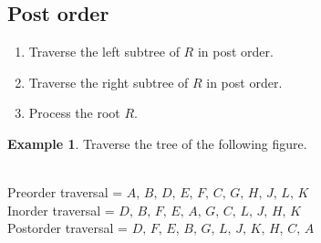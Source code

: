 \documentclass[12pt,oneside,a4paper]{book}
\theoremstyle{remark}
\theoremstyle{definition}
\newtheorem*{ex}{Example}
\begin{document}
\subsection{Post order}
\begin{enumerate}
    \item Traverse the left subtree of $ R $ in post order.
    \item Traverse the right subtree of $ R $ in post order.
    \item Process the root $ R $.
\end{enumerate}
\begin{ex}
    Traverse the tree of the following figure.\\
    \\
    Preorder traversal = $ A,\,B,\,D,\,E,\,F,\,C,\,G,\,H,\,J,\,L,\,K $\\
    Inorder traversal = $ D,\,B,\,F,\,E,\,A,\,G,\,C,\,L,\,J,\,H,\,K $\\
    Postorder traversal = $ D,\,F,\,E,\,B,\,G,\,L,\,J,\,K,\,H,\,C,\,A $ 
\end{ex}
\end{document}
